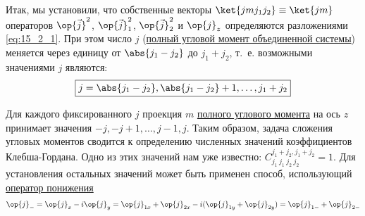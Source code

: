 Итак, мы установили, что собственные векторы $\ket{j m j_1 j_2} \equiv \ket{j m}$ операторов $\op{\vec{j}}^2$, $\op{\vec{j}}_1^2$, $\op{\vec{j}}_2^2$ и $\op{j}_z$ определяются разложениями \eqref{eq:15_2_1}. При этом число $j$ (\underline{полный угловой момент объединенной системы}) меняется через единицу от $\abs{j_1 - j_2}$ до $j_1 + j_2$, т.~е. возможными значениями $j$ являются:
\begin{equation}
\label{eq:15_2_4}
\boxed{j = \abs{j_1 - j_2}, \abs{j_1 - j_2} + 1, \dots, j_1 + j_2}
\end{equation}

Для каждого фиксированного $j$ проекция $m$ \underline{полного углового момента} на ось $z$ принимает значения $-j, -j + 1, \dots, j -1, j$. Таким образом, задача сложения угловых моментов сводится к определению численных значений коэффициентов Клебша-Гордана. Одно из этих значений нам уже известно: $C^{j_1+j_2, j_1 + j_2}_{j_1~j_1~j_2~j_2} = 1$. Для установления остальных значений может быть применен способ, использующий \underline{оператор понижения}
\begin{gather*}
\op{j}_- = \op{j}_x - i \op{j}_y = \op{j}_{1x} + \op{j}_{2x} - i (\op{j}_{1y} + \op{j}_{2y}) = \op{j}_{1-} + \op{j}_{2-}
\end{gather*}
